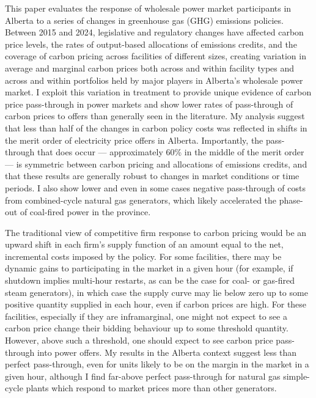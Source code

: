 \documentclass[12pt]{article}
\begin{document}
This paper evaluates the response of wholesale power market participants in Alberta to a series of changes in greenhouse gas (GHG) emissions policies. Between 2015 and 2024, legislative and regulatory changes have affected carbon price levels, the rates of output-based allocations of emissions credits, and the coverage of carbon pricing across facilities of different sizes, creating variation in average and marginal carbon prices both across and within facility types and across and within portfolios held by major players in Alberta's wholesale power market. I exploit this variation in treatment to provide unique evidence of carbon price pass-through in power markets and show lower rates of pass-through of carbon prices to offers than generally seen in the literature. My analysis suggest that less than half of the changes in carbon policy costs was reflected in shifts in the merit order of electricity price offers in Alberta. Importantly, the pass-through that does occur --- approximately 60\% in the middle of the merit order --- is symmetric between carbon pricing and allocations of emissions credits, and that these results are generally robust to changes in market conditions or time periods. I also show lower and even in some cases negative pass-through of costs from combined-cycle natural gas generators, which likely accelerated the phase-out of coal-fired power in the province. 

The traditional view of competitive firm response to carbon pricing would be an upward shift in each firm's supply function of an amount equal to the net, incremental costs imposed by the policy. For some facilities, there may be dynamic gains to participating in the market in a given hour (for example, if shutdown implies multi-hour restarts, as can be the case for coal- or gas-fired steam generators), in which case the supply curve may lie below zero up to some positive quantity supplied in each hour, even if carbon prices are high. For these facilities, especially if they are inframarginal, one might not expect to see a carbon price change their bidding behaviour up to some threshold quantity. However, above such a threshold, one should expect to see carbon price pass-through into power offers. My results in the Alberta context suggest less than perfect pass-through, even for units likely to be on the margin in the market in a given hour, although I find far-above perfect pass-through for natural gas simple-cycle plants which respond to market prices more than other generators.
\end{document}
